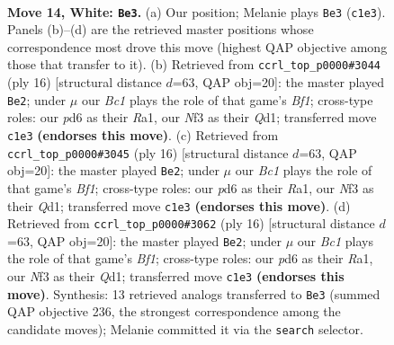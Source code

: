 \documentclass[11pt]{article}
\begin{document}
\clearpage

\begin{figure}[p]\centering
\begin{subfigure}{0.46\textwidth}\centering
\resizebox{\linewidth}{!}{%
\newchessgame
\chessboard[
  setfen={rnb1k2r/pp4b1/3pq1p1/2p2p1p/3P4/2N2N2/PPP1KPPP/R1BQ2R1 w kq - 3 14},
  showmover=false,
  pgfstyle=straightmove, color=movearrow, markmove={c1-e3}
]}
\caption{}
\end{subfigure}\hfill
\begin{subfigure}{0.46\textwidth}\centering
\resizebox{\linewidth}{!}{%
\newchessgame
\chessboard[
  setfen={rnb1k2r/pp3pp1/5q1p/2pp4/1b1P4/2N1PN2/PP3PPP/R2QKB1R w KQkq - 0 9},
  showmover=false,
  pgfstyle=straightmove, color=movearrow, markmove={f1-e2}
]}
\caption{}
\end{subfigure}
\\[4pt]
\begin{subfigure}{0.46\textwidth}\centering
\resizebox{\linewidth}{!}{%
\newchessgame
\chessboard[
  setfen={rnb1k2r/pp3pp1/5q1p/2pp4/1b1P4/2N1PN2/PP3PPP/R2QKB1R w KQkq - 0 9},
  showmover=false,
  pgfstyle=straightmove, color=movearrow, markmove={f1-e2}
]}
\caption{}
\end{subfigure}\hfill
\begin{subfigure}{0.46\textwidth}\centering
\resizebox{\linewidth}{!}{%
\newchessgame
\chessboard[
  setfen={rnb1k2r/pp3pp1/5q1p/2pp4/1b1P4/2N1PN2/PP3PPP/R2QKB1R w KQkq - 0 9},
  showmover=false,
  pgfstyle=straightmove, color=movearrow, markmove={f1-e2}
]}
\caption{}
\end{subfigure}
\caption{\textbf{Move 14, White: \texttt{Be3}.} (a) Our position; Melanie plays \texttt{Be3} (\texttt{c1e3}). Panels (b)--(d) are the retrieved master positions whose correspondence most drove this move (highest QAP objective among those that transfer to it). (b) Retrieved from \texttt{ccrl\_top\_p0000\#3044} (ply 16) [structural distance $d$=63, QAP obj=20]: the master played \texttt{Be2}; under $\mu$ our \emph{Bc1} plays the role of that game's \emph{Bf1}; cross-type roles: our \emph{p}d6 as their \emph{R}a1, our \emph{N}f3 as their \emph{Q}d1; transferred move \texttt{c1e3} \textbf{(endorses this move)}. (c) Retrieved from \texttt{ccrl\_top\_p0000\#3045} (ply 16) [structural distance $d$=63, QAP obj=20]: the master played \texttt{Be2}; under $\mu$ our \emph{Bc1} plays the role of that game's \emph{Bf1}; cross-type roles: our \emph{p}d6 as their \emph{R}a1, our \emph{N}f3 as their \emph{Q}d1; transferred move \texttt{c1e3} \textbf{(endorses this move)}. (d) Retrieved from \texttt{ccrl\_top\_p0000\#3062} (ply 16) [structural distance $d$=63, QAP obj=20]: the master played \texttt{Be2}; under $\mu$ our \emph{Bc1} plays the role of that game's \emph{Bf1}; cross-type roles: our \emph{p}d6 as their \emph{R}a1, our \emph{N}f3 as their \emph{Q}d1; transferred move \texttt{c1e3} \textbf{(endorses this move)}. Synthesis: 13 retrieved analogs transferred to \texttt{Be3} (summed QAP objective 236, the strongest correspondence among the candidate moves); Melanie committed it via the \texttt{search} selector.}
\label{fig:thought-m26}
\end{figure}
\end{document}
